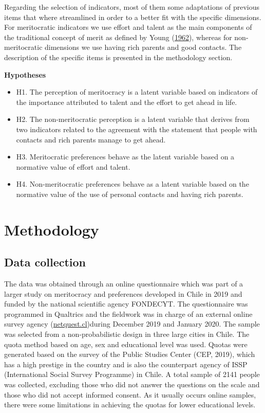 \documentclass[
]{article}
\begin{document}
Regarding the selection of indicators, most of them some adaptations of
previous items that where streamlined in order to a better fit with the
specific dimensions. For meritocratic indicators we use effort and
talent as the main components of the traditional concept of merit as
defined by Young (\protect\hyperlink{ref-young_rise_1962}{1962}),
whereas for non-meritocratic dimensions we use having rich parents and
good contacts. The description of the specific items is presented in the
methodology section.

\textbf{Hypotheses}

\begin{itemize}
\item
  H1. The perception of meritocracy is a latent variable based on
  indicators of the importance attributed to talent and the effort to
  get ahead in life.
\item
  H2. The non-meritocratic perception is a latent variable that derives
  from two indicators related to the agreement with the statement that
  people with contacts and rich parents manage to get ahead.
\item
  H3. Meritocratic preferences behave as the latent variable based on a
  normative value of effort and talent.
\item
  H4. Non-meritocratic preferences behave as a latent variable based on
  the normative value of the use of personal contacts and having rich
  parents.
\end{itemize}

\hypertarget{methodology}{%
\section{Methodology}\label{methodology}}

\hypertarget{data-collection}{%
\subsection{Data collection}\label{data-collection}}

The data was obtained through an online questionnaire which was part of
a larger study on meritocracy and preferences developed in Chile in 2019
and funded by the national scientific agency FONDECYT. The questionnaire
was programmed in Qualtrics and the fieldwork was in charge of an
external online survey agency
(\href{www.netquest.cl}{netquest.cl})during December 2019 and January
2020. The sample was selected from a non-probabilistic design in three
large cities in Chile. The quota method based on age, sex and
educational level was used. Quotas were generated based on the survey of
the Public Studies Center (CEP, 2019), which has a high prestige in the
country and is also the counterpart agency of ISSP (International Social
Survey Programme) in Chile. A total sample of 2141 people was collected,
excluding those who did not answer the questions on the scale and those
who did not accept informed consent. As it usually occurs online
samples, there were some limitations in achieving the quotas for lower
educational levels.
\end{document}
